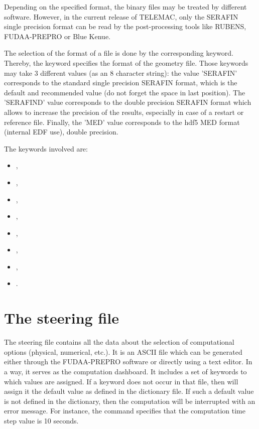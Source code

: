 Depending on the specified format, the binary files may be treated by different
software. However, in the current release of TELEMAC, only the SERAFIN single
precision format can be read by the post-processing tools like RUBENS,
FUDAA-PREPRO or Blue Kenue.

The selection of the format of a file is done by the corresponding keyword.
Thereby, the keyword  specifies the format of the
geometry file. Those keywords may take 3 different values (as an 8 character
string): the value 'SERAFIN' corresponds to the standard single precision
SERAFIN format, which is the default and recommended value (do not forget the
space in last position). The 'SERAFIND' value corresponds to the double
precision SERAFIN format which allows to increase the precision of the results,
especially in case of a restart or reference file. Finally, the 'MED' value
corresponds to the hdf5 MED format (internal EDF use), double precision.

The keywords involved are:

\begin{itemize}
\item {},

\item {},

\item {},

\item {},

\item {},

\item {},

\item {},

\item {}.
\end{itemize}

\section{The steering file}

The steering file contains all the data about the selection of computational
options (physical, numerical, etc.). It is an ASCII file which can be generated
either through the FUDAA-PREPRO software or directly using a text
editor. In a way, it serves as the computation dashboard. It includes a set of
keywords to which values are assigned. If a keyword does not occur in that
file, then  will assign it the default value as defined in the
dictionary file. If such a default value is not defined in the dictionary, then
the computation will be interrupted with an error message. For instance, the
command  specifies that the computation time step
value is 10 seconds.

